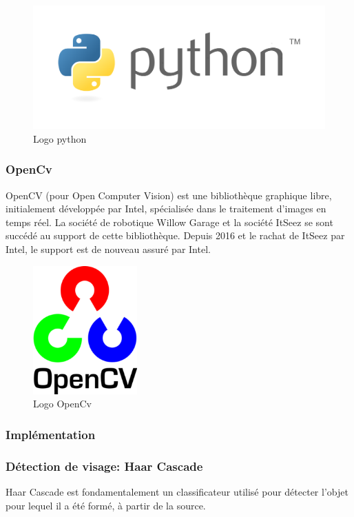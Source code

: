 \documentclass[12pt]{article}
\begin{document}
\begin{figure}[h]
	\centering
	\includegraphics[width=12cm]{img-Chapiter-4/Python_logo.png}
	\caption{Logo python}
\end{figure}

\subsubsection*{OpenCv}
OpenCV (pour Open Computer Vision) est une bibliothèque graphique libre, initialement développée par Intel, spécialisée dans le traitement d'images en temps réel. La société de robotique Willow Garage et la société ItSeez se sont succédé au support de cette bibliothèque. Depuis 2016 et le rachat de ItSeez par Intel, le support est de nouveau assuré par Intel. 
\newpage
\begin{figure}[h]
	\centering
	\includegraphics[width=4cm]{img-Chapiter-4/open.png}
	\caption{Logo OpenCv}
\end{figure}

\subsubsection{Implémentation}

\subsubsection*{Détection de visage: Haar Cascade}
Haar Cascade est fondamentalement un classificateur utilisé pour détecter l'objet pour lequel il a été formé, à partir de la source.
\end{document}
